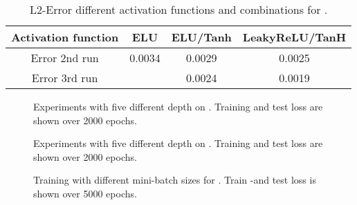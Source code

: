\begin{table}[!htbp]\centering
	\begin{tabular}{ |c|c|c|c| }
		\hline
		Activation function & ELU & ELU/Tanh & LeakyReLU/TanH \\ 
		\hline
		Error 2nd run& 0.0034 & 0.0029 & 0.0025\\ \hline
		Error 3rd run& 		  & 0.0024 & 0.0019 \\ \hline
	\end{tabular}
	\caption{L2-Error different activation functions and combinations for \hy.}
	\label{Tab:Activations Rare 2nd}
\end{table}
\begin{center}
	\begin{figure}[htbp!]
		\scalebox{.9}{}
		\scalebox{.9}{}
		\scalebox{.9}{}
		\scalebox{.9}{}
		\scalebox{.9}{}
		\caption{Experiments with five different depth on \hy. Training and test loss are shown over 2000 epochs.}
		\label{Fig:Depth Hydro}
	\end{figure}
\end{center}
\begin{center}
	\begin{figure}[htbp!]
		\scalebox{.9}{}
		\scalebox{.9}{}
		\scalebox{.9}{}
		\scalebox{.9}{}
		\scalebox{.9}{}
		\caption{Experiments with five different depth on \rare. Training and test loss are shown over 2000 epochs.}
		\label{Fig:Depth Rare}
	\end{figure}
\end{center}
\begin{center}
	\begin{figure}[htbp!]
		\scalebox{.9}{}
		\scalebox{.9}{}
		\scalebox{.9}{}
		\scalebox{.9}{}
		\scalebox{.9}{}
		\scalebox{.9}{}
		\caption{Training with different mini-batch sizes for \hy. Train -and test loss is shown over 5000 epochs.}
		\label{Fig:Batch Hy}
	\end{figure}
\end{center}
